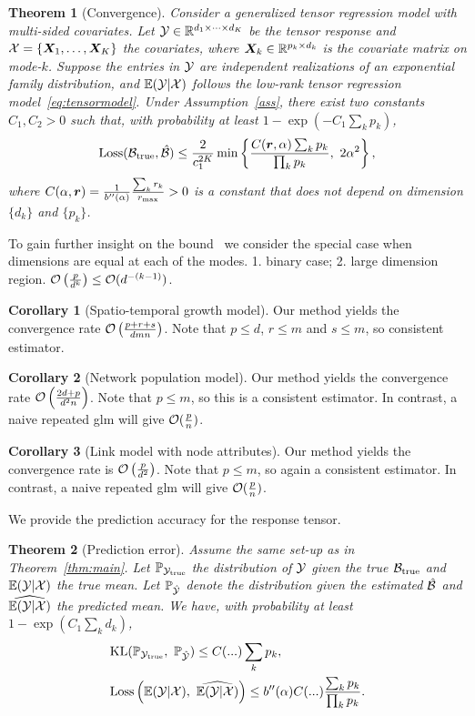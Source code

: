 \documentclass[twoside]{article}
\theoremstyle{plain}
\newtheorem{thm}{Theorem}[section]
\theoremstyle{definition}
\newtheorem{cor}{Corollary}
\begin{document}
  
\begin{thm}[Convergence]\label{thm:main}
Consider a generalized tensor regression model with multi-sided covariates. Let $\mathcal{Y}\in\mathbb{R}^{d_1\times \cdots\times d_K}$ be the tensor response and $\mathcal{X}=\{\bm X_1,\ldots,\bm X_K\}$ the covariates, where $\bm X_k\in\mathbb{R}^{p_k\times d_k}$ is the covariate matrix on mode-$k$. Suppose the entries in $\mathcal{Y}$ are independent realizations of an exponential family distribution, and $\mathbb{E}(\mathcal{Y}|\mathcal{X})$ follows the low-rank tensor regression model~\eqref{eq:tensormodel}. Under Assumption~\ref{ass}, there exist two constants $C_1, C_2>0$ such that, with probability at least $1-\exp(-C_1\sum_k p_k)$, 
\[
\text{Loss}(\trueB, \hat \tB) \leq  {2\over c_1^{2K}} \min\left\{ {C(\mr,\alpha)\sum_k p_k \over \prod_k p_k},\ 2\alpha^2 \right\},
\]
where $C(\alpha,\bm{r})={1 \over b''(\alpha)}{\sum_k r_k \over r_{\max}}>0$ is a constant that does not depend on dimension $\{d_k\}$ and $\{p_k\}$. 
\end{thm}

To gain further insight on the bound~\label{thm:main} we consider the special case when dimensions are equal at each of the modes. 1. binary case; 2. large dimension region. $\mathcal{O}\left({p \over d^k}\right)\leq \mathcal{O}(d^{-(k-1)})$.

\begin{cor}[Spatio-temporal growth model] Our method yields the convergence rate $\mathcal{O}\left({p+r+s\over dmn}\right)$. Note that $p\leq d$, $r\leq m$ and $s\leq m$, so consistent estimator. 
\end{cor}

\begin{cor} [Network population model] Our method yields the convergence rate $\mathcal{O}\left({2d+p\over d^2n}\right)$. Note that $p\leq m$, so this is a consistent estimator. In contrast, a naive repeated glm will give $\mathcal{O}({p\over n})$.
\end{cor}

\begin{cor} [Link model with node attributes] Our method yields the convergence rate is $\mathcal{O}\left({p\over d^2}\right)$. Note that $p\leq m$, so again a consistent estimator. In contrast, a naive repeated glm will give $\mathcal{O}({p\over n})$.
\end{cor}

We provide the prediction accuracy for the response tensor.  
\begin{thm} [Prediction error]
Assume the same set-up as in Theorem~\eqref{thm:main}. Let $\mathbb{P}_{\mathcal{Y}_{\text{true}}}$ the distribution of $\mathcal{Y}$ given the true $\mathcal{B}_{\text{true}}$ and $\mathbb{E}(\mathcal{Y}|\mathcal{X})$ the true mean. Let $\mathbb{P}_{\hat {\mathcal{Y}}}$ denote the distribution given the estimated $\hat {\mathcal{B}}$ and $\widehat{\mathbb{E}(\mathcal{Y}|\mathcal{X})}$ the predicted mean. We have, with probability at least $1-\exp(C_1\sum_k d_k)$,
\begin{align}
&\text{KL}(\mathbb{P}_{\tY_{\text{true}}},\ \mathbb{P}_{\hat \tY})\leq  C(...) \sum_k p_k,\\
&\text{Loss}\left(\mathbb{E}(\tY|\tX),\ \widehat{\mathbb{E}(\tY|\tX)}\right)\leq b''(\alpha)C(...) {\sum_k p_k\over \prod_k p_k}.
\end{align}
\end{thm}
\end{document}

